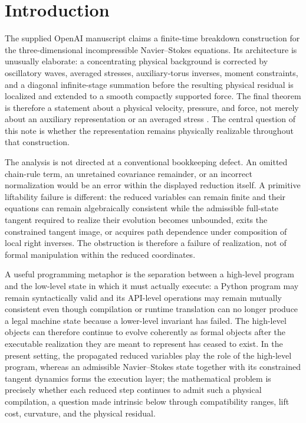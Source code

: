 \documentclass[12pt]{article}
\begin{document}
\tableofcontents
\newpage

\section{Introduction}
The supplied OpenAI manuscript claims a finite-time breakdown construction for the three-dimensional incompressible Navier--Stokes equations. Its architecture is unusually elaborate: a concentrating physical background is corrected by oscillatory waves, averaged stresses, auxiliary-torus inverses, moment constraints, and a diagonal infinite-stage summation before the resulting physical residual is localized and extended to a smooth compactly supported force. The final theorem is therefore a statement about a physical velocity, pressure, and force, not merely about an auxiliary representation or an averaged stress \cite{OpenAI2026,Fefferman}. The central question of this note is whether the representation remains physically realizable throughout that construction.

The analysis is not directed at a conventional bookkeeping defect. An omitted chain-rule term, an unretained covariance remainder, or an incorrect normalization would be an error within the displayed reduction itself. A primitive liftability failure is different: the reduced variables can remain finite and their equations can remain algebraically consistent while the admissible full-state tangent required to realize their evolution becomes unbounded, exits the constrained tangent image, or acquires path dependence under composition of local right inverses. The obstruction is therefore a failure of realization, not of formal manipulation within the reduced coordinates.

A useful programming metaphor is the separation between a high-level program and the low-level state in which it must actually execute: a Python program may remain syntactically valid and its API-level operations may remain mutually consistent even though compilation or runtime translation can no longer produce a legal machine state because a lower-level invariant has failed. The high-level objects can therefore continue to evolve coherently as formal objects after the executable realization they are meant to represent has ceased to exist. In the present setting, the propagated reduced variables play the role of the high-level program, whereas an admissible Navier--Stokes state together with its constrained tangent dynamics forms the execution layer; the mathematical problem is precisely whether each reduced step continues to admit such a physical compilation, a question made intrinsic below through compatibility ranges, lift cost, curvature, and the physical residual.
\end{document}
